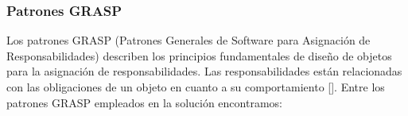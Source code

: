 
\subsubsection{Patrones GRASP}
Los patrones GRASP (Patrones Generales de Software para Asignación de Responsabilidades) describen los principios fundamentales de diseño de objetos para la asignación de responsabilidades. Las responsabilidades  están relacionadas con las obligaciones de un objeto en cuanto a su comportamiento [\cite{97}]. Entre los patrones GRASP empleados en la solución encontramos:

